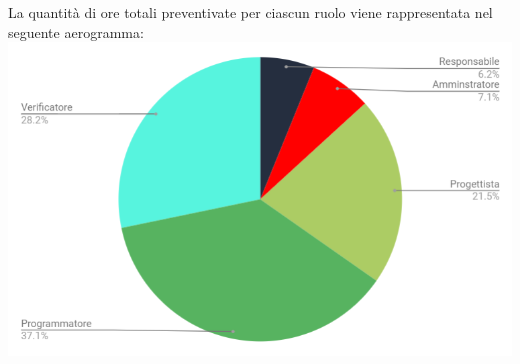 \vskip 30pt %
\newpage
La quantità di ore totali preventivate per ciascun ruolo viene rappresentata nel seguente aerogramma:\\
\includegraphics[width=1\textwidth]{./src/Preventivo/src/img/TortaSviluppo.png}
